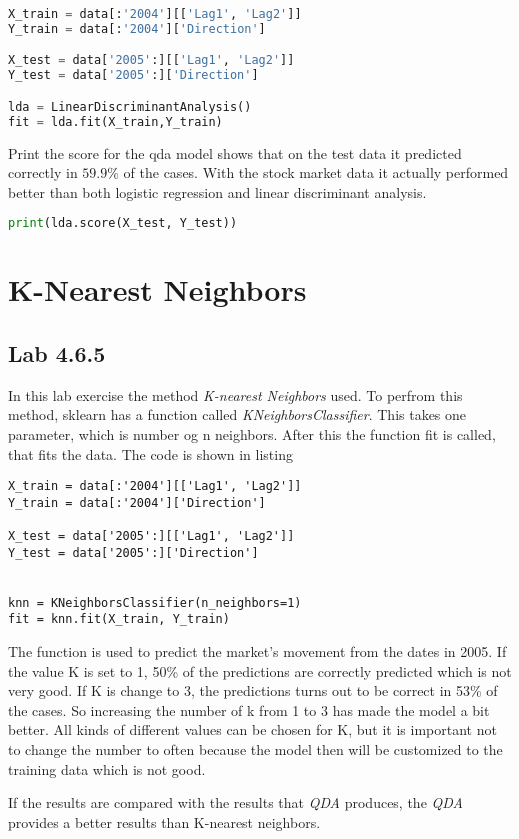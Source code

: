 \begin{lstlisting}[language=Python, label=lst:qdaModel, caption=creating quadratic discriminant analysis model sklearn]
X_train = data[:'2004'][['Lag1', 'Lag2']]
Y_train = data[:'2004']['Direction']

X_test = data['2005':][['Lag1', 'Lag2']]
Y_test = data['2005':]['Direction']

lda = LinearDiscriminantAnalysis()
fit = lda.fit(X_train,Y_train)
\end{lstlisting}

Print the score for the qda model shows that on the test data it predicted correctly in $59.9\%$ of the cases. With the stock market data it actually performed better than both logistic regression and linear discriminant analysis.
\begin{lstlisting}[language=Python, label=lst:qdaScore, caption=printing lda score]
print(lda.score(X_test, Y_test))
\end{lstlisting}

\section{K-Nearest Neighbors}

\subsection{Lab 4.6.5}

In this lab exercise the method \emph{K-nearest Neighbors} used. To perfrom this method, sklearn has a function called \emph{KNeighborsClassifier}. This takes one parameter, which is number og n neighbors. After this the function fit is called, that fits the data.
The code is shown in listing

\begin{lstlisting}[caption={Python K-Nearest neighbors function, where K is set to 1}, label=lst:kneighbor, mathescape=true]
X_train = data[:'2004'][['Lag1', 'Lag2']]
Y_train = data[:'2004']['Direction']

X_test = data['2005':][['Lag1', 'Lag2']]
Y_test = data['2005':]['Direction']


knn = KNeighborsClassifier(n_neighbors=1)
fit = knn.fit(X_train, Y_train)
\end{lstlisting}

The function is used to predict the market's movement from the dates in 2005. If the value K is set to 1, 50\% of the predictions are correctly predicted which is not very good.
If K is change to 3, the predictions turns out to be correct in 53\% of the cases. So increasing the number of k from 1 to 3 has made the model a bit better. All kinds of different values can be chosen for K, but it is important not to change the number to often because the model then will be customized to the training data which is not good.

If the results are compared with the results that \emph{QDA} produces, the \emph{QDA} provides a better results than K-nearest neighbors.